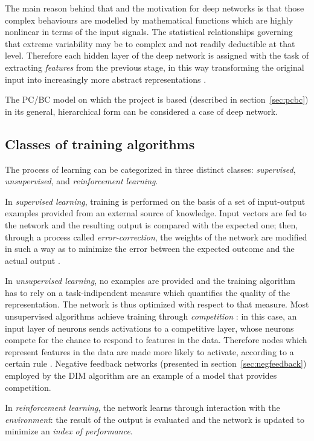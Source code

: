 \documentclass[11pt,a4paper]{report}
\begin{document}
				The main reason behind that and the motivation for deep networks is that those complex behaviours are modelled by mathematical functions which are highly nonlinear in terms of the input signals. The statistical relationships governing that extreme variability may be to complex and not readily deductible at that level. Therefore each hidden layer of the deep network is assigned with the task of extracting \emph{features} from the previous stage, in this way transforming the original input into increasingly more abstract representations \cite{bengio2009learning}.
				
				The PC/BC model on which the project is based (described in section~\ref{sec:pcbc}) in its general, hierarchical form can be considered a case of deep network.
		
			\subsection{Classes of training algorithms}
				The process of learning can be categorized in three distinct classes: \emph{supervised}, \emph{unsupervised}, and \emph{reinforcement learning}.
				
				In \emph{supervised learning}, training is performed on the basis of a set of input-output examples provided from an external source of knowledge. Input vectors are fed to the network and the resulting output is compared with the expected one; then, through a process called \emph{error-correction}, the weights of the network are modified in such a way as to minimize the error between the expected outcome and the actual output \cite{haykin2009neural}.
				
				In \emph{unsupervised learning}, no examples are provided and the training algorithm has to rely on a task-indipendent measure which quantifies the quality of the representation. The network is thus optimized with respect to that measure. Most unsupervised algorithms achieve training through \emph{competition} \cite{spratling2009unsupervised}: in this case, an input layer of neurons sends activations to a competitive layer, whose neurons compete for the chance to respond to features in the data. Therefore nodes which represent features in the data are made more likely to activate, according to a certain rule \cite{haykin2009neural}. Negative feedback networks (presented in section~\ref{sec:negfeedback}) employed by the DIM algorithm are an example of a model that provides competition.
				
				In \emph{reinforcement learning}, the network learns through interaction with the \emph{environment}: the result of the output is evaluated and the network is updated to minimize an \emph{index of performance}.	
		
\end{document}

